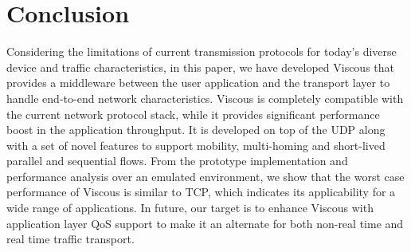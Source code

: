 \section{Conclusion}
Considering the limitations of current transmission protocols for today’s diverse device and traffic characteristics, in this paper, we have developed Viscous that provides a middleware between the user application and the transport layer to handle end-to-end network characteristics. Viscous is completely compatible with the current network protocol stack, while it provides significant performance boost in the application throughput. It is developed on top of the UDP along with a set of novel features to support mobility, multi-homing and short-lived parallel and sequential flows. From the prototype implementation and performance analysis over an emulated environment, we show that the worst case performance of Viscous is similar to TCP, which indicates its applicability for a wide range of applications. 
In future, our target is to enhance Viscous with application layer QoS support to make it an alternate for both non-real time and real time traffic transport.  
